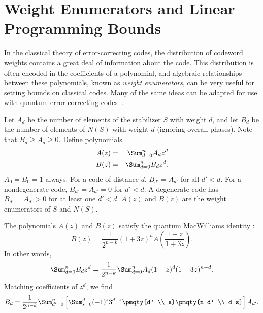 \section{Weight Enumerators and Linear Programming Bounds}
\label{sec-enumerators}

In the classical theory of error-correcting codes, the distribution of
codeword weights contains a great deal of information about the code.
This distribution is often encoded in the coefficients of a polynomial, and
algebraic relationships between these polynomials, known as {\em weight
enumerators}, can be very useful for setting bounds on classical codes.
Many of the same ideas can be adapted for use with quantum
error-correcting codes~\cite{rains-shadow, shor-laflamme-QMW,
	rains-enumerators, rains-poly-invariants}.

Let $A_d$ be the number of elements of the stabilizer $S$ with weight $d$,
and let $B_d$ be the number of elements of $N(S)$ with weight $d$ (ignoring
overall phases).  Note that $B_d \geq A_d \geq 0$.  Define polynomials
\begin{eqnarray}
	A (z) & = & \Sum_{d=0}^{n} A_d z^d \\
	B (z) & = & \Sum_{d=0}^{n} B_d z^d.
\end{eqnarray}
$A_0 = B_0 = 1$ always.  For a code of distance $d$, $B_{d'} = A_{d'}$ for
all $d' < d$.  For a nondegenerate code, $B_{d'} = A_{d'} = 0$ for $d' < d$.  A
degenerate code has $B_{d'} = A_{d'} > 0$ for at least one $d' < d$.  $A(z)$
and $B(z)$ are the weight enumerators of $S$ and $N(S)$.

The polynomials $A(z)$ and $B(z)$ satisfy the quantum MacWilliams
identity \cite{shor-laflamme-QMW}:
\begin{equation}
	B(z) = \frac{1}{2^{n-k}} (1+3z)^n A \left( \frac{1-z}{1+3z} \right).
	\label{eq-QMW}
\end{equation}
In other words,
\begin{equation}
	\Sum_{d=0}^{n} B_d z^d = \frac{1}{2^{n-k}} \Sum_{d=0}^{n} A_d (1-z)^d
	(1+3z)^{n-d}.
\end{equation}
Matching coefficients of $z^d$, we find
\begin{equation}
	B_d = \frac{1}{2^{n-k}} \Sum_{d'=0}^{n} \left[ \Sum_{s=0}^{d} (-1)^s 3^{d-s}
	\pmqty{d' \\ s} \pmqty{n-d' \\ d-s} \right] A_{d'}.
\end{equation}

